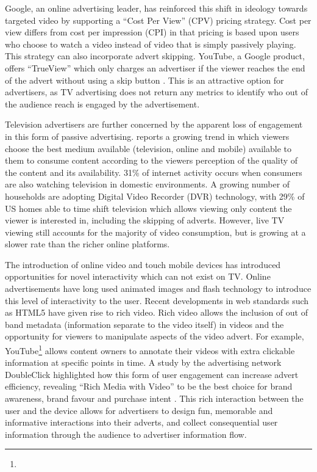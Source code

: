 	Google, an online advertising leader, has reinforced this shift in ideology towards targeted video by supporting a ``Cost Per View'' (CPV) pricing strategy. Cost per view differs from cost per impression (CPI) in that pricing is based upon users who choose to watch a video instead of video that is simply passively playing. This strategy can also incorporate advert skipping. YouTube, a Google product, offers ``TrueView'' which only charges an advertiser if the viewer reaches the end of the advert without using a skip button \citep{trueview}. This is an attractive option for advertisers, as TV advertising does not return any metrics to identify who out of the audience reach is engaged by the advertisement.

	Television advertisers are further concerned by the apparent loss of engagement in this form of passive advertising. \citet{three-screen} reports a growing trend in which viewers choose the best medium available (television, online and mobile) available to them to consume content according to the viewers perception of the quality of the content and its availability. 31\% of internet activity occurs when consumers are also watching television in domestic environments. A growing number of households are adopting Digital Video Recorder (DVR) technology, with 29\% of US homes able to time shift television which allows viewing only content the viewer is interested in, including the skipping of adverts. However, live TV viewing still accounts for the majority of video consumption, but is growing at a slower rate than the richer online platforms. \citep{three-screen}

	The introduction of online video and touch mobile devices has introduced opportunities for novel interactivity which can not exist on TV. Online advertisements have long used animated images and flash technology to introduce this level of interactivity to the user. Recent developments in web standards such as HTML5 have given rise to rich video. Rich video allows the inclusion of out of band metadata (information separate to the video itself) in videos and the opportunity for viewers to manipulate aspects of the video advert. For example, YouTube\footnote{} allows content owners to annotate their videos with extra clickable information at specific points in time. A study by the advertising network DoubleClick highlighted how this form of user engagement can increase advert efficiency, revealing ``Rich Media with Video'' to be the best choice for brand awareness, brand favour and purchase intent \citep{rich-video}. This rich interaction between the user and the device allows for advertisers to design fun, memorable and informative interactions into their adverts, and collect consequential user information through the audience to advertiser information flow.

